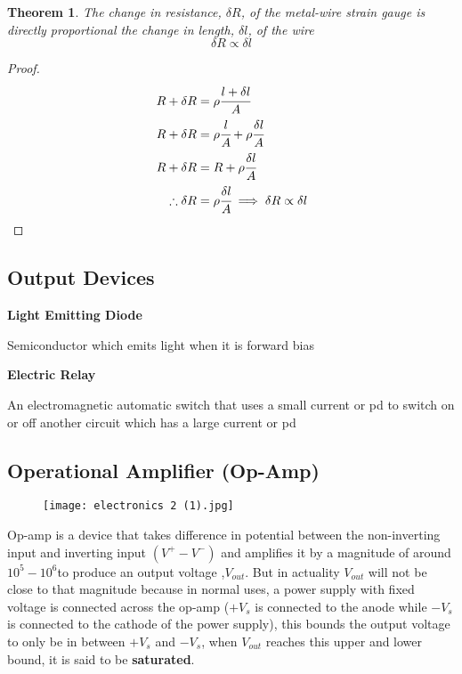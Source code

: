 \documentclass{article}
\newtheorem{theorem}{Theorem}[subsection]
\begin{document}
 \begin{theorem}
 The change in resistance, $\delta R$, of the metal-wire strain gauge is directly proportional the change in length, $\delta l$, of the wire
 $$\delta R \propto \delta l$$
 \end{theorem}
 \begin{proof}
 \begingroup
 \allowdisplaybreaks
\begin{align*}
    R+\delta R &=\rho\cfrac{l+\delta l}{A} \\ 
    R+\delta R &=\rho\cfrac{l}{A}+\rho\cfrac{\delta l}{A} \\ 
    R+\delta R &=R+\rho\cfrac{\delta l}{A} \\ 
    \therefore \delta R &=\rho\cfrac{\delta l}{A} \implies  \delta R  \propto \delta l 
\end{align*}
\endgroup \end{proof}

\subsection{Output Devices}
\begin{flushleft}
\textbf{Light Emitting Diode}
\end{flushleft}
Semiconductor which emits light when it is forward bias
\begin{flushleft}
\textbf{Electric Relay}
\end{flushleft}
An electromagnetic automatic switch that uses a small current or pd to switch on or off another circuit which has a large current or pd


 
 \subsection{Operational Amplifier (Op-Amp)}
 
 \begin{figure}[H]
     \centering
     \texttt{[image: electronics 2 (1).jpg]}
 \end{figure}
 Op-amp is a device that takes difference in potential between the non-inverting input and inverting input $(V^+-V^-)$ and amplifies it by a magnitude of around $10^5-10^6$to produce an output voltage ,$V_{out}$. But in actuality $V_{out}$ will not be close to that magnitude because in normal uses, a power supply with fixed voltage is connected across the op-amp  ($+V_s$ is connected to the anode while $-V_s$is connected to the cathode of the power supply), this bounds the output voltage to only be in between $+V_s$ and $-V_s$, when $V_{out}$ reaches this upper and lower bound, it is said to be \textbf{saturated}. 
 
\end{document}
